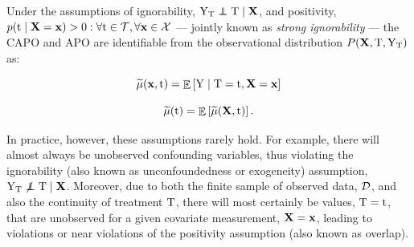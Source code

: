 Under the assumptions of ignorability, $\YT \indep \Tf \mid \X$, and positivity, $p(\mathrm{t} \mid \mathbf{X} = \mathbf{x}) > 0 : \forall \mathrm{t} \in \mathcal{T}, \forall \mathbf{x} \in \mathcal{X}$ — jointly  known as \emph{strong ignorability}  \citep{rosenbaum1983central} — the CAPO and APO are identifiable from the observational distribution $P(\mathbf{X}, \mathrm{T}, \mathrm{Y}_{\mathrm{T}})$ as:
\noindent
\begin{minipage}{.5\linewidth}
    \begin{equation}
        \label{eq:CAPO_stat}
         \widetilde{\mu}(\mathbf{x}, \mathrm{t}) = \mathop{\mathbb{E}}\left[ \mathrm{Y} \mid \mathrm{T} = \mathrm{t}, \mathbf{X} = \mathbf{x} \right]
    \end{equation}
\end{minipage}%
\begin{minipage}{.5\linewidth}
    \begin{equation}
        \label{eq:APO_stat}
         \widetilde{\mu}(\mathrm{t}) = \mathop{\mathbb{E}}\left[ \widetilde{\mu}(\mathbf{X}, \mathrm{t}) \right].
    \end{equation}
\end{minipage}

In practice, however, these assumptions rarely hold. For example, there will almost always be unobserved confounding variables, thus violating the ignorability (also known as unconfoundedness or exogeneity) assumption, $\YT \not\indep \Tf \mid \X$.
Moreover, due to both the finite sample of observed data, $\mathcal{D}$, and also the continuity of treatment $\mathrm{T}$, there will most certainly be values, $\mathrm{T}=\mathrm{t}$, that are unobserved for a given covariate measurement, $\mathbf{X}=\mathbf{x}$, leading to violations or near violations of the positivity assumption (also known as overlap).